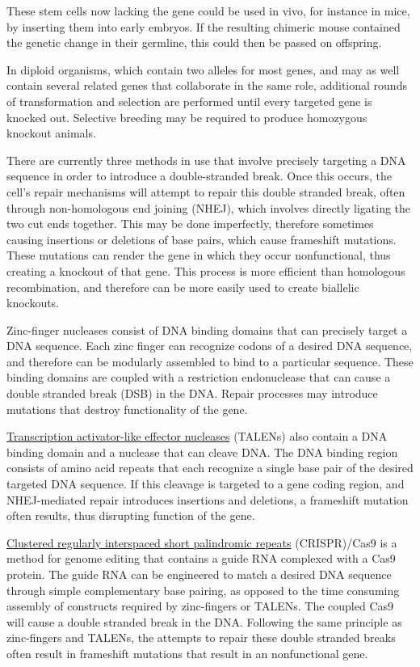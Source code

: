 These stem cells now lacking the gene could be used in vivo, for instance in mice, by inserting them into early embryos. If the resulting chimeric mouse contained the genetic change in their germline, this could then be passed on offspring.

In diploid organisms, which contain two alleles for most genes, and may as well contain several related genes that collaborate in the same role, additional rounds of transformation and selection are performed until every targeted gene is knocked out. Selective breeding may be required to produce homozygous knockout animals.

There are currently three methods in use that involve precisely targeting a DNA sequence in order to introduce a double-stranded break. Once this occurs, the cell's repair mechanisms will attempt to repair this double stranded break, often through non-homologous end joining (NHEJ), which involves directly ligating the two cut ends together. This may be done imperfectly, therefore sometimes causing insertions or deletions of base pairs, which cause frameshift mutations. These mutations can render the gene in which they occur nonfunctional, thus creating a knockout of that gene. This process is more efficient than homologous recombination, and therefore can be more easily used to create biallelic knockouts.

Zinc-finger nucleases consist of DNA binding domains that can precisely target a DNA sequence. Each zinc finger can recognize codons of a desired DNA sequence, and therefore can be modularly assembled to bind to a particular sequence. These binding domains are coupled with a restriction endonuclease that can cause a double stranded break (DSB) in the DNA. Repair processes may introduce mutations that destroy functionality of the gene.

\href{https://en.wikipedia.org/wiki/Transcription_activator-like_effector_nuclease}{Transcription activator-like effector nucleases} (TALENs) also contain a DNA binding domain and a nuclease that can cleave DNA. The DNA binding region consists of amino acid repeats that each recognize a single base pair of the desired targeted DNA sequence. If this cleavage is targeted to a gene coding region, and NHEJ-mediated repair introduces insertions and deletions, a frameshift mutation often results, thus disrupting function of the gene.

\href{https://en.wikipedia.org/wiki/CRISPR}{Clustered regularly interspaced short palindromic repeats} (CRISPR)/Cas9 is a method for genome editing that contains a guide RNA complexed with a Cas9 protein. The guide RNA can be engineered to match a desired DNA sequence through simple complementary base pairing, as opposed to the time consuming assembly of constructs required by zinc-fingers or TALENs. The coupled Cas9 will cause a double stranded break in the DNA. Following the same principle as zinc-fingers and TALENs, the attempts to repair these double stranded breaks often result in frameshift mutations that result in an nonfunctional gene.

